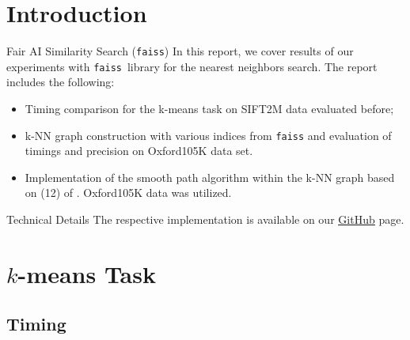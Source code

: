\section{Introduction}

\begin{frame}
	\begin{block}{Fair AI Similarity Search (\texttt{faiss})}
		In this report, we cover results of our experiments with \texttt{faiss}\footnotemark \, library \cite{Johnson2017} for the nearest neighbors search. The report includes the following:
		\begin{itemize}
			\item Timing comparison for the k-means task on SIFT2M data evaluated before;
			\item k-NN graph construction with various indices from \texttt{faiss} and evaluation of timings and precision on Oxford105K data set.
			\item Implementation of the smooth path algorithm within the k-NN graph based on (12) of \cite{Johnson2017}. Oxford105K data was utilized.
		\end{itemize}
	\end{block}
	
	\begin{block}{Technical Details}
		The respective implementation is available on our \href{https://github.com/salisaresama/computer-vision}{{\color{blue}\underline{GitHub}}} page.
	\end{block}
	
	\addtocounter{footnote}{-1}
\end{frame}


\section{$k$-means Task}
\subsection{Timing}


